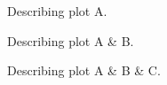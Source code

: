 \documentclass{minimal}
\begin{document}
  \setlength{\parindent}{0pt}

  \newif\ifA\newif\ifB\newif\ifC

  Describing plot A.

  \Atrue  %

  Describing plot A \& B.

  \Btrue  %

  Describing plot A \& B \& C.

  \Ctrue  %
\end{document}
